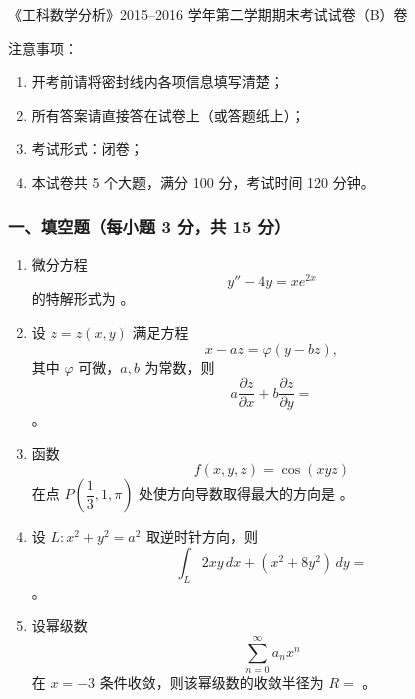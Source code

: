 《工科数学分析》2015--2016 学年第二学期期末考试试卷（B）卷

注意事项：
\begin{enumerate}
  \item 开考前请将密封线内各项信息填写清楚；
  \item 所有答案请直接答在试卷上（或答题纸上）；
  \item 考试形式：闭卷；
  \item 本试卷共 5 个大题，满分 100 分，考试时间 120 分钟。
\end{enumerate}

\subsubsection*{一、填空题（每小题 3 分，共 15 分）}
\begin{enumerate}
  \item 微分方程
  \[
  y''-4y=xe^{2x}
  \]
  的特解形式为 \underline{\hspace{4cm}}。
  \item 设 $z=z(x,y)$ 满足方程
  \[
  x-az=\varphi(y-bz),
  \]
  其中 $\varphi$ 可微，$a,b$ 为常数，则
  \[
  a\frac{\partial z}{\partial x}+b\frac{\partial z}{\partial y}=
  \]
  \underline{\hspace{3cm}}。
  \item 函数
  \[
    f(x,y,z)=\cos(xyz)
  \]
  在点 $P\!\left(\dfrac13,1,\pi\right)$ 处使方向导数取得最大的方向是 \underline{\hspace{4cm}}。
  \item 设 $L:x^2+y^2=a^2$ 取逆时针方向，则
  \[
  \int_L 2xy\,dx+(x^2+8y^2)\,dy=
  \]
  \underline{\hspace{3cm}}。
  \item 设幂级数
  \[
  \sum_{n=0}^{\infty}a_nx^n
  \]
  在 $x=-3$ 条件收敛，则该幂级数的收敛半径为 $R=$ \underline{\hspace{2cm}}。
\end{enumerate}

